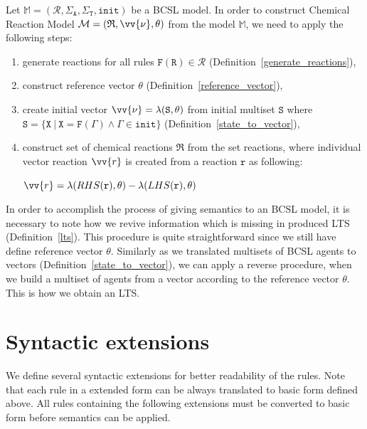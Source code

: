 \documentclass[12pt]{fithesis2}
\begin{document}
Let $\mathds{M} = (\mathcal{R}, \Sigma_\mathtt{A}, \Sigma_\mathtt{T}, \mathtt{init})$ be a BCSL model. In order to construct Chemical Reaction Model $\mathcal{M} = (\mathfrak{R}, \vv{\nu}, \theta)$ from the model $\mathds{M}$, we need to apply the following steps:

\begin{enumerate}
\item generate reactions for all rules $\mathtt{F}(\mathtt{R}) \in \mathcal{R}$ (Definition~\ref{generate_reactions}),
\item construct reference vector $\theta$ (Definition~\ref{reference_vector}),
\item create initial vector $\vv{\nu} = \lambda(\mathtt{S}, \theta)$ from initial multiset $\mathtt{S}$ where $\mathtt{S} = \{ \mathtt{X} ~|~ \mathtt{X} = \mathtt{F}(\Gamma) \wedge \Gamma \in \mathtt{init} \}$ (Definition~\ref{state_to_vector}),
\item construct set of chemical reactions $\mathfrak{R}$ from the set reactions, where individual vector reaction $\vv{r}$ is created from a reaction $\mathtt{r}$ as following:

\begin{center}
$\vv{r} = \lambda(RHS(\mathtt{r}), \theta) - \lambda(LHS(\mathtt{r}), \theta)$
\end{center}

\end{enumerate}

In order to accomplish the process of giving semantics to an BCSL model, it is necessary to note how we revive information which is missing in produced LTS (Definition~\ref{lts}). This procedure is quite straightforward since we still have define reference vector $\theta$. Similarly as we translated multisets of BCSL agents to vectors (Definition~\ref{state_to_vector}), we can apply a reverse procedure, when we build a multiset of agents from a vector according to the reference vector $\theta$. This is how we obtain an LTS.  

\section{Syntactic extensions}
\label{syntactic_extensions}

We define several syntactic extensions for better readability of the rules. Note that each rule in a extended form can be always translated to basic form defined above. All rules containing the following extensions must be converted to basic form before semantics can be applied.
\end{document}
